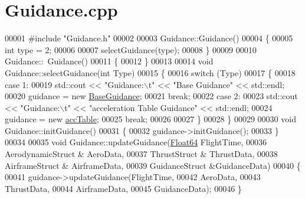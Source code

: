 \hypertarget{_guidance_8cpp_source}{}\section{Guidance.\+cpp}
\label{_guidance_8cpp_source}

\begin{DoxyCode}
00001 \textcolor{preprocessor}{#include "Guidance.h"}
00002 
00003 Guidance::Guidance()
00004 \{
00005     \textcolor{keywordtype}{int} type = 2;
00006 
00007     selectGuidance(type);
00008 \}
00009 
00010 Guidance::~Guidance()
00011 \{
00012 \}
00013 
00014 \textcolor{keywordtype}{void} Guidance::selectGuidance(\textcolor{keywordtype}{int} Type)
00015 \{
00016     \textcolor{keywordflow}{switch} (Type)
00017     \{
00018     \textcolor{keywordflow}{case} 1:
00019         std::cout << \textcolor{stringliteral}{"Guidance:\(\backslash\)t"} << \textcolor{stringliteral}{"Base Guidance"} << std::endl;
00020         guidance = \textcolor{keyword}{new} \hyperlink{class_base_guidance}{BaseGuidance};
00021         \textcolor{keywordflow}{break};
00022     \textcolor{keywordflow}{case} 2:
00023         std::cout << \textcolor{stringliteral}{"Guidance:\(\backslash\)t"} << \textcolor{stringliteral}{"acceleration Table Guidance"} << std::endl;
00024         guidance = \textcolor{keyword}{new} \hyperlink{classacc_table}{accTable};
00025         \textcolor{keywordflow}{break};
00026 
00027     \}
00028 \}
00029 
00030 \textcolor{keywordtype}{void} Guidance::initGuidance()
00031 \{
00032     guidance->initGuidance();
00033 \}
00034 
00035 \textcolor{keywordtype}{void} Guidance::updateGuidance(\hyperlink{group___tools_ga3f1431cb9f76da10f59246d1d743dc2c}{Float64} FlightTime, 
00036                               AerodynamicStruct & AeroData,
00037                               ThrustStruct & ThrustData,  
00038                               AirframeStruct & AirframeData,
00039                               GuidanceStruct &GuidanceData)
00040 \{
00041     guidance->updateGuidance(FlightTime,
00042                              AeroData,
00043                              ThrustData,
00044                              AirframeData,
00045                              GuidanceData);
00046 \}
\end{DoxyCode}
